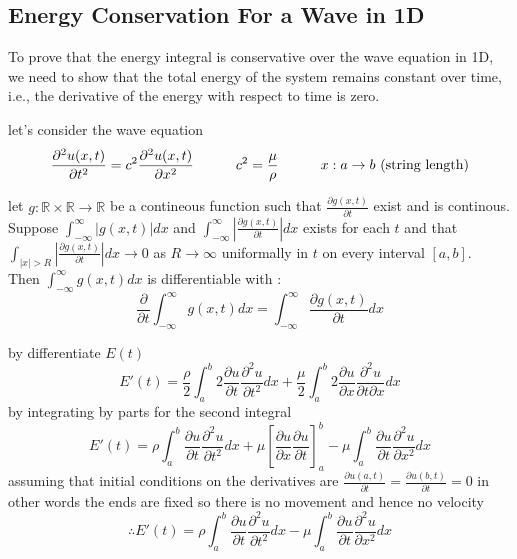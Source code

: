 \documentclass[]{article}
\begin{document}
\subsection{Energy Conservation For a Wave in 1D}
To prove that the energy integral is conservative over the wave equation in 1D,
we need to show that the total energy of the system remains constant over time, i.e., the derivative of the energy with respect to time is zero.
\par
let's consider the wave equation
\[
    \frac{\partial^2 u(x,t)}{\partial t^2} = c^2 \frac{\partial^2 u(x,t)}{\partial x^2} \quad\quad\quad c^2 = \frac{\mu}{\rho} \quad\quad\quad x : a\to b \text{ (string length)}
\]
\begin{theorem}
    let $g : \mathbb{R}\times\mathbb{R} \to \mathbb{R}$ be a contineous function such that $\displaystyle \frac{\partial g(x,t)}{\partial t}$ exist and is continous.
    \\
    Suppose $\displaystyle \int_{-\infty}^{\infty} |g(x,t)| dx $  and   $\displaystyle \int_{-\infty}^{\infty} |\frac{\partial g(x,t)}{\partial t}| dx $ exists for each $t$
    and that $\displaystyle \int_{|x|>R} |\frac{\partial g(x,t)}{\partial t}| dx \to 0 $ as $R \to \infty$ uniformally in $t$ on every interval $[a,b]$.\
    \\
    Then $\displaystyle \int_{-\infty}^{\infty} g(x,t) dx $ is differentiable with :
    \[
        \frac{\partial}{\partial t} \int_{-\infty}^{\infty} g(x,t) dx = \int_{-\infty}^{\infty} \frac{\partial g(x,t)}{\partial t} dx
    \]
\end{theorem}
by differentiate $E(t)$
\[
E'(t) = \frac{\rho}{2} \int_{a}^{b} 2\frac{\partial u}{\partial t}\frac{\partial^2 u}{\partial t^2} dx + \frac{\mu}{2} \int_{a}^{b} 2\frac{\partial u}{\partial x}\frac{\partial^2 u}{\partial t\partial x} dx    
\]
by integrating by parts for the second integral 
\[
E'(t) = \rho \int_{a}^{b} \frac{\partial u}{\partial t}\frac{\partial^2 u}{\partial t^2} dx +\mu\left[\frac{\partial u}{\partial x}\frac{\partial u}{\partial t}\right]_{a}^{b} -\mu \int_{a}^{b} \frac{\partial u}{\partial t}\frac{\partial^2 u}{\partial x^2} dx    
\]
\newpage 
assuming that initial conditions on the derivatives are
$\displaystyle \frac{\partial u(a,t)}{\partial t} = \frac{\partial u(b,t)}{\partial t} = 0$
in other words the ends are fixed so there is no movement and hence no velocity
\[
\therefore E'(t) = \rho \int_{a}^{b} \frac{\partial u}{\partial t}\frac{\partial^2 u}{\partial t^2} dx -\mu \int_{a}^{b} \frac{\partial u}{\partial t}\frac{\partial^2 u}{\partial x^2} dx    
\]
\end{document}
